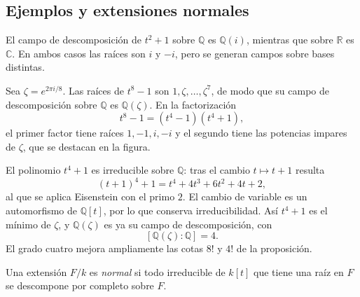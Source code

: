 \subsection{Ejemplos y extensiones normales}
\begin{ejem}
El campo de descomposición de $t^2+1$ sobre $\mathbb Q$ es $\mathbb Q(i)$, mientras que sobre $\mathbb R$ es $\mathbb C$. En ambos casos las raíces son $i$ y $-i$, pero se generan campos sobre bases distintas.
\end{ejem}

\begin{ejem}\label{ejem:C24-octavas}
Sea $\zeta=e^{2\pi i/8}$. Las raíces de $t^8-1$ son $1,\zeta,\ldots,\zeta^7$, de modo que su campo de descomposición sobre $\mathbb Q$ es $\mathbb Q(\zeta)$. En la factorización
\[
t^8-1=(t^4-1)(t^4+1),
\]
el primer factor tiene raíces $1,-1,i,-i$ y el segundo tiene las potencias impares de $\zeta$, que se destacan en la figura.

El polinomio $t^4+1$ es irreducible sobre $\mathbb Q$: tras el cambio $t\mapsto t+1$ resulta
\[
(t+1)^4+1=t^4+4t^3+6t^2+4t+2,
\]
al que se aplica Eisenstein con el primo $2$. El cambio de variable es un automorfismo de $\mathbb Q[t]$, por lo que conserva irreducibilidad. Así $t^4+1$ es el mínimo de $\zeta$, y $\mathbb Q(\zeta)$ es ya su campo de descomposición, con
\[
[\mathbb Q(\zeta):\mathbb Q]=4.
\]
El grado cuatro mejora ampliamente las cotas $8!$ y $4!$ de la proposición.
\end{ejem}

\begin{defi}
Una extensión $F/k$ es \emph{normal} si todo irreducible de $k[t]$ que tiene una raíz en $F$ se descompone por completo sobre $F$.
\end{defi}

